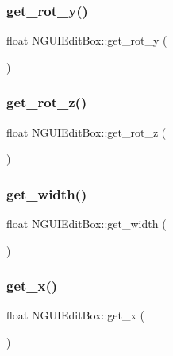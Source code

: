 \subsubsection{\texorpdfstring{get\+\_\+rot\+\_\+y()}{get\_rot\_y()}}
{\footnotesize\ttfamily float N\+G\+U\+I\+Edit\+Box\+::get\+\_\+rot\+\_\+y (\begin{DoxyParamCaption}{ }\end{DoxyParamCaption})}

\hypertarget{class_n_g_u_i_edit_box_a59576f2c67331a9229c66c620e07e336}{}\label{class_n_g_u_i_edit_box_a59576f2c67331a9229c66c620e07e336} 
\subsubsection{\texorpdfstring{get\+\_\+rot\+\_\+z()}{get\_rot\_z()}}
{\footnotesize\ttfamily float N\+G\+U\+I\+Edit\+Box\+::get\+\_\+rot\+\_\+z (\begin{DoxyParamCaption}{ }\end{DoxyParamCaption})}

\hypertarget{class_n_g_u_i_edit_box_aa440a78837f282377b6a23d40bb3ba90}{}\label{class_n_g_u_i_edit_box_aa440a78837f282377b6a23d40bb3ba90} 
\subsubsection{\texorpdfstring{get\+\_\+width()}{get\_width()}}
{\footnotesize\ttfamily float N\+G\+U\+I\+Edit\+Box\+::get\+\_\+width (\begin{DoxyParamCaption}{ }\end{DoxyParamCaption})}

\hypertarget{class_n_g_u_i_edit_box_aacd6f55a8832b670409ad94d55743daf}{}\label{class_n_g_u_i_edit_box_aacd6f55a8832b670409ad94d55743daf} 
\subsubsection{\texorpdfstring{get\+\_\+x()}{get\_x()}}
{\footnotesize\ttfamily float N\+G\+U\+I\+Edit\+Box\+::get\+\_\+x (\begin{DoxyParamCaption}{ }\end{DoxyParamCaption})}

